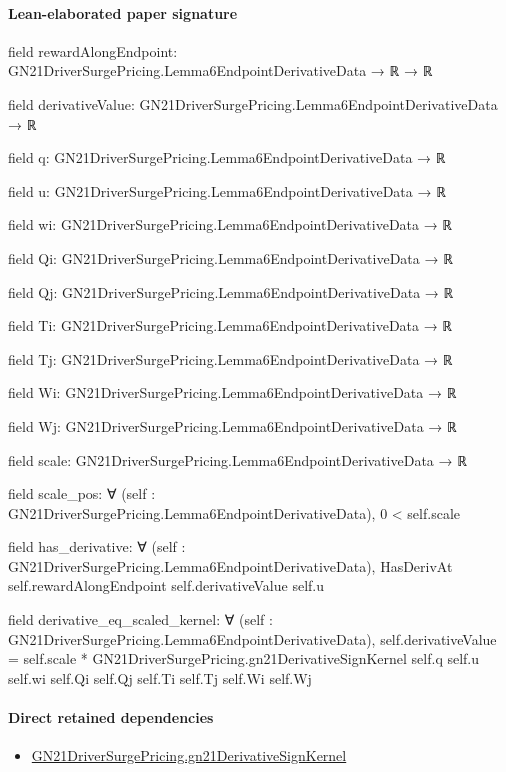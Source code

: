 \documentclass[10pt]{article}
\begin{document}
\paragraph{Lean-elaborated paper signature}
\begin{ReviewVerbatim}
field rewardAlongEndpoint:
GN21DriverSurgePricing.Lemma6EndpointDerivativeData → ℝ → ℝ

field derivativeValue:
GN21DriverSurgePricing.Lemma6EndpointDerivativeData → ℝ

field q:
GN21DriverSurgePricing.Lemma6EndpointDerivativeData → ℝ

field u:
GN21DriverSurgePricing.Lemma6EndpointDerivativeData → ℝ

field wi:
GN21DriverSurgePricing.Lemma6EndpointDerivativeData → ℝ

field Qi:
GN21DriverSurgePricing.Lemma6EndpointDerivativeData → ℝ

field Qj:
GN21DriverSurgePricing.Lemma6EndpointDerivativeData → ℝ

field Ti:
GN21DriverSurgePricing.Lemma6EndpointDerivativeData → ℝ

field Tj:
GN21DriverSurgePricing.Lemma6EndpointDerivativeData → ℝ

field Wi:
GN21DriverSurgePricing.Lemma6EndpointDerivativeData → ℝ

field Wj:
GN21DriverSurgePricing.Lemma6EndpointDerivativeData → ℝ

field scale:
GN21DriverSurgePricing.Lemma6EndpointDerivativeData → ℝ

field scale_pos:
∀ (self : GN21DriverSurgePricing.Lemma6EndpointDerivativeData), 0 < self.scale

field has_derivative:
∀ (self : GN21DriverSurgePricing.Lemma6EndpointDerivativeData),
  HasDerivAt self.rewardAlongEndpoint self.derivativeValue self.u

field derivative_eq_scaled_kernel:
∀ (self : GN21DriverSurgePricing.Lemma6EndpointDerivativeData),
  self.derivativeValue =
    self.scale *
      GN21DriverSurgePricing.gn21DerivativeSignKernel self.q self.u self.wi self.Qi self.Qj self.Ti self.Tj self.Wi
        self.Wj
\end{ReviewVerbatim}

\paragraph{Direct retained dependencies}
\begin{itemize}\raggedright
\item \hyperlink{governing-declaration-d60579a03ce3baca}{GN21\allowbreak{}Driver\allowbreak{}Surge\allowbreak{}Pricing.\allowbreak{}gn21\allowbreak{}Derivative\allowbreak{}Sign\allowbreak{}Kernel}
\end{itemize}
\end{document}
